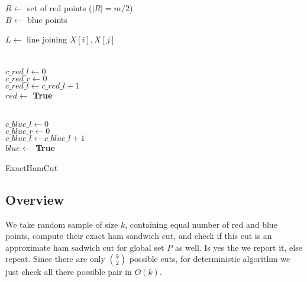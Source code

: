 \documentclass[a4paper]{article}
\begin{document}
\begin{algorithm}[H]
\SetAlgoLined
{}
$R \leftarrow$ set of red points ($|R| = m/2$) \\
$B \leftarrow$ blue points \\
 {
	 {
		$L \leftarrow$ line joining $X[i], X[j]$ \\
		\\
		\\
		$c\_red\_l \leftarrow 0$  \\
		$c\_red\_r \leftarrow 0$  \\
		 {
			 {
				$c\_red\_l \leftarrow c\_red\_l + 1$\\
			}
		}
		 {
			$red \leftarrow $ \textbf{True} \\
		}

		\\
		$c\_blue\_l \leftarrow 0$  \\
		$c\_blue\_r \leftarrow 0$  \\
		 {
			 {
				$c\_blue\_l \leftarrow c\_blue\_l + 1$\\
			}
		}
		 {
			$blue \leftarrow $ \textbf{True} \\
		}

		 {
		}
	}
}
\caption*{ExactHamCut}
\end{algorithm}
\subsection*{Overview}
We take random sample of size $k$, containing equal number of red and blue points,
compute their exact ham sandwich cut, and
check if this cut is an approximate ham sadwich cut for global set $P$ as well.
Is yes the we report it, else repeat. Since there are only $k\choose2$ possible cuts, for deterministic algorithm we just check all there possible pair in $O(k)$.
\end{document}
